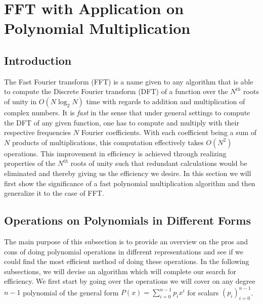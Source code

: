 \documentclass[../article.tex]{subfiles}
\begin{document}
\section{FFT with Application on Polynomial Multiplication}
\subsection{Introduction}
The Fast Fourier transform (FFT) is a name given to any algorithm that is able to compute the Discrete Fourier transform (DFT) of a function over the $N^{th}$ roots of unity in $O(N\log_2{N})$ time with regards to addition and multiplication of complex numbers. It is \emph{fast} in the sense that under general settings to compute the DFT of any given function, one has to compute and multiply with their respective frequencies $N$ Fourier coefficients. With each coefficient being a sum of $N$ products of multiplications, this computation effectively takes $O(N^2)$ operations. This improvement in efficiency is achieved through realizing properties of the $N^{th}$ roots of unity such that redundant calculations would be eliminated and thereby giving us the efficiency we desire. In this section we will first show the significance of a fast polynomial multiplication algorithm and then generalize it to the case of FFT.

\subsection{Operations on Polynomials in Different Forms}
The main purpose of this subsection is to provide an overview on the pros and cons of doing polynomial operations in different representations and see if we could find the most efficient method of doing these operations. In the following subsections, we will devise an algorithm which will complete our search for efficiency. We first start by going over the operations we will cover on any degree $n-1$ polynomial of the general form $P(x) = \sum_{i=0}^{n-1} p_ix^i$ for scalars $(p_i)_{i=0}^{n-1}$.
\end{document}
